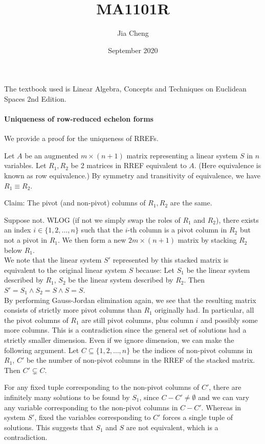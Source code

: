 \documentclass{article}
\title{MA1101R}
\author{Jia Cheng}
\date{September 2020}
\begin{document}
\maketitle

The textbook used is Linear Algebra, Concepts and Techniques on Euclidean Spaces 2nd Edition.

\paragraph{Uniqueness of row-reduced echelon forms} We provide a proof for the uniqueness of RREFs.

Let $A$ be an augmented $m\times (n+1)$ matrix representing a linear system $S$ in $n$ variables. Let $R_1, R_2$ be 2 matrices in RREF equivalent to $A$. (Here equivalence is known as row equivalence.) By symmetry and transitivity of equivalence, we have $R_1\equiv R_2$.

Claim: The pivot (and non-pivot) columns of $R_1, R_2$ are the same.

Suppose not. WLOG (if not we simply swap the roles of $R_1$ and $R_2$), there exists an index $i\in \{1,2,\dots, n\}$ such that the $i$-th column is a pivot column in $R_2$ but not a pivot in $R_1$. We then form a new $2m\times (n+1)$ matrix by stacking $R_2$ below $R_1$. \\
We note that the linear system $S'$ represented by this stacked matrix is equivalent to the original linear system $S$ because: Let $S_1$ be the linear system described by $R_1$, $S_2$ be the linear system described by $R_2$. Then $S' = S_1\land S_2 = S\land S = S$.\\
By performing Gauss-Jordan elimination again, we see that the resulting matrix consists of strictly more pivot columns than $R_1$ originally had. In particular, all the pivot columns of $R_1$ are still pivot columns, plus column $i$ and possibly some more columns. This is a contradiction since the general set of solutions had a strictly smaller dimension. Even if we ignore dimension, we can make the following argument. Let $C\subseteq \{1,2,\dots,n\}$ be the indices of non-pivot columns in $R_1$, $C'$ be the  number of non-pivot columns in the RREF of the stacked matrix. Then $C'\subsetneq C$.

For any fixed tuple corresponding to the non-pivot columns of $C'$, there are infinitely many solutions to be found by $S_1$, since $C-C'\neq \emptyset$ and we can vary any variable corresponding to the non-pivot columns in $C-C'$. Whereas in system $S'$, fixed the variables corresponding to $C'$ forces a single tuple of solutions. This suggests that $S_1$ and $S$ are not equivalent, which is a contradiction.
\end{document}
